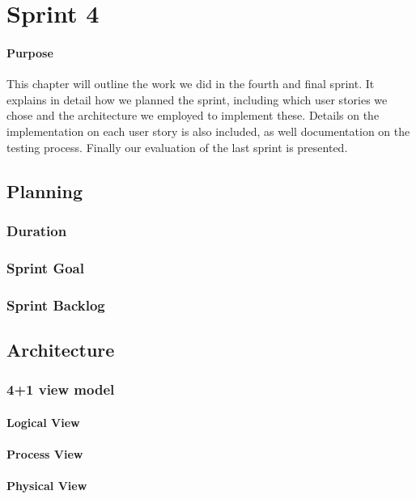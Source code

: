 \chapter{Sprint 4}

\minitoc

\subsubsection{Purpose}

This chapter will outline the work we did in the fourth and final sprint. It explains in detail how we planned the sprint, including which user stories we chose and the architecture we employed to implement these. Details on the implementation on each user story is also included, as well documentation on the testing process. Finally our evaluation of the last sprint is presented.

\clearpage


\section{Planning}
\subsection{Duration}
\subsection{Sprint Goal}
\subsection{Sprint Backlog}

\section{Architecture}
\subsection{4+1 view model}
\subsubsection{Logical View}
\subsubsection{Process View}
\subsubsection{Physical View}
